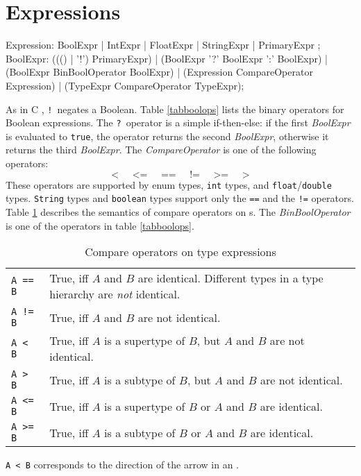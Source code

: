 \section{Expressions}
\label{expressions}
\begin{rail}
  Expression: BoolExpr | IntExpr | FloatExpr | StringExpr | PrimaryExpr ;  
  BoolExpr: ((() | '!') PrimaryExpr) | (BoolExpr '?' BoolExpr ':' BoolExpr) | (BoolExpr BinBoolOperator BoolExpr) | (Expression CompareOperator Expression) | (TypeExpr CompareOperator TypeExpr);
\end{rail}
As in C \cite{Sch:1990:ANSIC}, \texttt{!}\ negates a Boolean. 
Table \ref{tabboolops} lists the binary operators for Boolean expressions. 
The \texttt{?}\ operator is a simple if-then-else: if the first \emph{BoolExpr} is evaluated to \texttt{true}, the operator returns the second \emph{BoolExpr}, otherwise it returns the third \emph{BoolExpr}.
The \emph{CompareOperator} is one of the following operators:
\[ \texttt{<} \;\;\;\;\; \texttt{<=} \;\;\;\;\; \texttt{==} \;\;\;\;\; \texttt{!=} \;\;\;\;\; \texttt{>=} \;\;\;\;\; \texttt{>} \]
These operators are supported by enum types, \texttt{int} types, and \texttt{float}/\texttt{double} types.
\texttt{String} types and \texttt{boolean} types support only the \texttt{==} and the \texttt{!=} operators.
Table \ref{compandtypes} describes the semantics of compare operators on s.
The \emph{BinBoolOperator} is one of the operators in table \ref{tabboolops}.
\begin{table}[htbp]
  \centering
  \begin{tabularx}{\linewidth}{|l|X|} \hline
    \texttt{A == B} & True, iff $A$ and $B$ are identical. Different types in a type hierarchy are \emph{not} identical. \\
    \texttt{A != B} & True, iff $A$ and $B$ are not identical. \\
    \texttt{A < B} & True, iff $A$ is a supertype of $B$, but $A$ and $B$ are not identical. \\
    \texttt{A > B} & True, iff $A$ is a subtype of $B$, but $A$ and $B$ are not identical. \\
    \texttt{A <= B} & True, iff $A$ is a supertype of $B$ or $A$ and $B$ are identical. \\
    \texttt{A >= B} & True, iff $A$ is a subtype of $B$ or $A$ and $B$ are identical. \\ \hline
  \end{tabularx}
  \caption{Compare operators on type expressions}
  \label{compandtypes}
\end{table}
\begin{note}
  \texttt{A < B} corresponds to the direction of the arrow in an .
\end{note}

